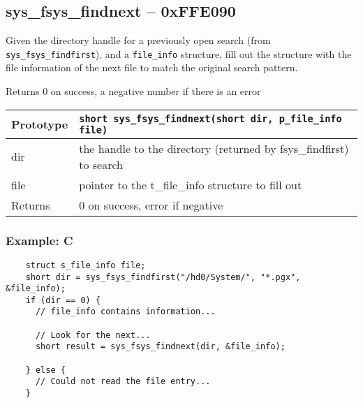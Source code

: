 \subsection*{sys\_fsys\_findnext -- 0xFFE090}
Given the directory handle for a previously open search (from \verb+sys_fsys_findfirst+), and a \verb+file_info+ structure,
fill out the structure with the file information of the next file to match the original search pattern.

Returns 0 on success, a negative number if there is an error

\bigskip

\begin{tabular}{|l||l|} \hline
Prototype & \lstinline!short sys_fsys_findnext(short dir, p_file_info file)! \\ \hline
dir & the handle to the directory (returned by fsys\_findfirst) to search \\ \hline
file & pointer to the t\_file\_info structure to fill out \\ \hline
Returns & 0 on success, error if negative \\ \hline
\end{tabular}

\subsubsection*{Example: C}
\begin{lstlisting}
    struct s_file_info file;
    short dir = sys_fsys_findfirst("/hd0/System/", "*.pgx", &file_info);
    if (dir == 0) {
      // file_info contains information...

      // Look for the next...
      short result = sys_fsys_findnext(dir, &file_info);

    } else {
      // Could not read the file entry...
    }
\end{lstlisting}

